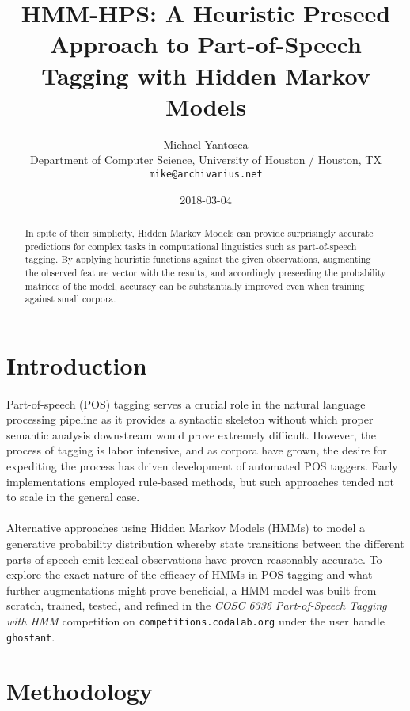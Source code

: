 \documentclass[11pt,a4paper]{article}
\title{HMM-HPS: A Heuristic Preseed Approach to Part-of-Speech Tagging with Hidden Markov Models}
\author{Michael Yantosca \\
  Department of Computer Science, University of Houston / Houston, TX \\
  {\tt mike@archivarius.net} \\}
\date{2018-03-04}
\begin{document}
\maketitle
\begin{abstract}
  In spite of their simplicity, Hidden Markov Models can
  provide surprisingly accurate predictions for complex tasks in
  computational linguistics such as part-of-speech tagging.
  By applying heuristic functions against the given observations,
  augmenting the observed feature vector with the results, and
  accordingly preseeding the probability matrices of the model,
  accuracy can be substantially improved even when training against small corpora.
\end{abstract}

\section{Introduction}

\paragraph{}
Part-of-speech (POS) tagging serves a crucial role in the natural language processing
pipeline as it provides a syntactic skeleton without which proper semantic analysis
downstream would prove extremely difficult. However, the process of tagging is labor
intensive, and as corpora have grown, the desire for expediting the process has driven
development of automated POS taggers. Early implementations employed rule-based methods,
but such approaches tended not to scale in the general case.

\paragraph{}
Alternative approaches using Hidden Markov Models (HMMs) to model a generative probability
distribution whereby state transitions between the different parts of speech emit lexical
observations have proven reasonably accurate.
To explore the exact nature of the efficacy of HMMs in POS tagging and what further
augmentations might prove beneficial, a HMM model was built from scratch, trained,
tested, and refined in the \emph{COSC 6336 Part-of-Speech Tagging with HMM} competition
on \texttt{competitions.codalab.org} under the user handle \texttt{ghostant}.

\section{Methodology}
\end{document}
